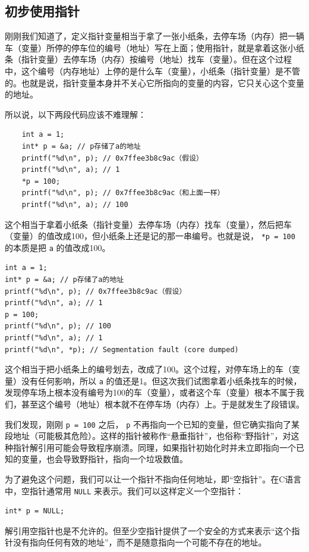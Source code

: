 \subsection{初步使用指针}

刚刚我们知道了，定义指针变量相当于拿了一张小纸条，去停车场（内存）把一辆车（变量）所停的停车位的编号（地址）写在上面；使用指针，就是拿着这张小纸条（指针变量）去停车场（内存）按编号（地址）找车（变量）。但在这个过程中，这个编号（内存地址）上停的是什么车（变量），小纸条（指针变量）是不管的。也就是说，指针变量本身并不关心它所指向的变量的内容，它只关心这个变量的地址。

所以说，以下两段代码应该不难理解：
\begin{verbatim}
    int a = 1;
    int* p = &a; // p存储了a的地址
    printf("%d\n", p); // 0x7ffee3b8c9ac（假设）
    printf("%d\n", a); // 1
    *p = 100; 
    printf("%d\n", p); // 0x7ffee3b8c9ac（和上面一样）
    printf("%d\n", a); // 100
\end{verbatim}
这个相当于拿着小纸条（指针变量）去停车场（内存）找车（变量），然后把车（变量）的值改成100，但小纸条上还是记的那一串编号。也就是说， \verb|*p = 100| 的本质是把 \verb|a| 的值改成100。

\begin{verbatim}
int a = 1;
int* p = &a; // p存储了a的地址
printf("%d\n", p); // 0x7ffee3b8c9ac（假设）
printf("%d\n", a); // 1
p = 100;
printf("%d\n", p); // 100
printf("%d\n", a); // 1
printf("%d\n", *p); // Segmentation fault (core dumped)
\end{verbatim}
这个相当于把小纸条上的编号划去，改成了100。这个过程，对停车场上的车（变量）没有任何影响，所以 \verb|a| 的值还是1。但这次我们试图拿着小纸条找车的时候，发现停车场上根本没有编号为100的车（变量），或者这个车（变量）根本不属于我们，甚至这个编号（地址）根本就不在停车场（内存）上。于是就发生了段错误。

我们发现，刚刚 \verb|p = 100| 之后， \verb|p| 不再指向一个已知的变量，但它确实指向了某段地址（可能极其危险）。这样的指针被称作“悬垂指针”，也俗称“野指针”，对这种指针解引用可能会导致程序崩溃。同理，如果指针初始化时并未立即指向一个已知的变量，也会导致野指针，指向一个垃圾数值。

为了避免这个问题，我们可以让一个指针不指向任何地址，即“空指针”。在C语言中，空指针通常用 \verb|NULL| 来表示。我们可以这样定义一个空指针：
\begin{verbatim}
int* p = NULL;
\end{verbatim}
解引用空指针也是不允许的。但至少空指针提供了一个安全的方式来表示“这个指针没有指向任何有效的地址”，而不是随意指向一个可能不存在的地址。

